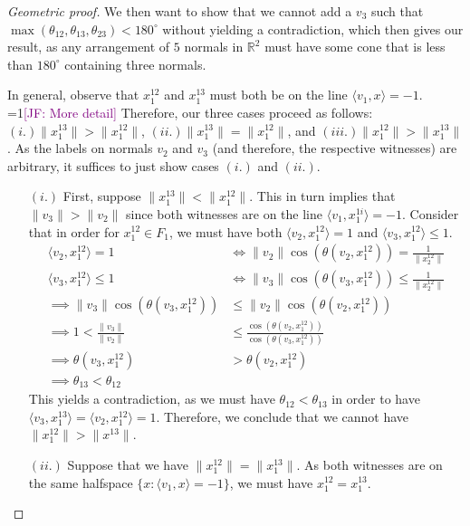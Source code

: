 \documentclass[anon]{colt2020} %
\newcommand{\Comments}{1}
\newcommand{\mynote}[2]{\ifnum\Comments=1\textcolor{#1}{#2}\fi}
\newcommand{\jessie}[1]{\mynote{purple}{[JF: #1]}}
\newcommand{\reals}{\mathbb{R}}
\newcommand{\inprod}[2]{\langle #1, #2 \rangle}%
\begin{document}
\begin{proof}[Geometric proof]
  We then want to show that we cannot add a $v_3$ such that $\max(\theta_{12}, \theta_{13}, \theta_{23}) < 180^\circ$ without yielding a contradiction, which then gives our result, as any arrangement of $5$ normals in $\reals^2$ must have some cone that is less than $180^\circ$ containing three normals.

  In general, observe that $x^{12}_1$ and $x^{13}_1$ must both be on the line $\inprod{v_1}{x} = -1$. \jessie{More detail}  
  Therefore, our three cases proceed as follows: $(i.) \|x^{13}_1\| > \|x^{12}_1\|$, $(ii.) \|x^{13}_1\| = \|x^{12}_1\|$, and $(iii.) \|x^{12}_1\| > \|x^{13}_1\|$.
  As the labels on normals $v_2$ and $v_3$ (and therefore, the respective witnesses) are arbitrary, it suffices to just show cases $(i.)$ and $(ii.)$.
  
  \begin{enumerate}
  \item [$(i.)$] First, suppose $\|x^{13}_1\| < \|x^{12}_1\|$.
  This in turn implies that $\|v_3\| > \|v_2\|$ since both witnesses are on the line $\inprod{v_1}{x^{1i}_1} = -1$.
  Consider that in order for $x^{12}_1 \in F_1$, we must have both $\inprod{v_2}{x^{12}_1} = 1$ and $\inprod{v_3}{x^{12}_1} \leq 1$.
    \begin{align*}
    \inprod{v_2}{x^{12}_1} = 1 &\iff \|v_2\| \cos(\theta(v_2, x^{12}_1)) = \frac 1 {\|x^{12}_2\|}\\
    \inprod{v_3}{x^{12}_1} \leq 1 &\iff \|v_3\| \cos(\theta(v_3, x^{12}_1)) \leq \frac 1 {\|x^{12}_2\|}\\
\implies \|v_3\| \cos(\theta(v_3, x^{12}_1)) &\leq \|v_2\| \cos(\theta(v_2, x^{12}_1))\\
\implies 1 < \frac{\|v_3\|}{\|v_2\|} &\leq \frac{\cos(\theta(v_2, x^{12}_1))}{\cos(\theta(v_3, x^{12}_1))}\\
\implies \theta(v_3, x^{12}_1) &> \theta(v_2, x^{12}_1)\\
\implies \theta_{13} < \theta_{12}
    \end{align*}
    This yields a contradiction, as we must have $\theta_{12} < \theta_{13}$ in order to have $\inprod{v_3}{x^{13}_1} = \inprod{v_2}{x^{12}_1} = 1$.
    Therefore, we conclude that we cannot have $\|x^{12}_1\| > \|x^{13}\|$.
  	\item [$(ii.)$] Suppose that we have $\|x^{12}_1\| = \|x^{13}_1\|$.
  	As both witnesses are on the same halfspace $\{x : \inprod{v_1}{x} = -1\}$, we must have $x^{12}_1 = x^{13}_1$.
  	
  \end{enumerate}  
  

\end{proof}
\end{document}
